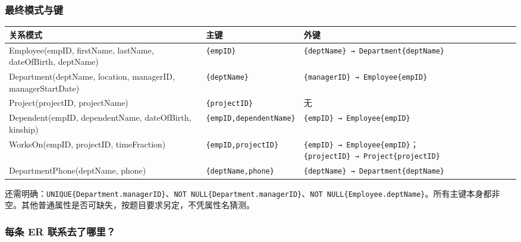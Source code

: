 \subsubsection{最终模式与键}\label{04_er_to_relational_mapping_zh-ux6700ux7ec8ux6a21ux5f0fux4e0eux952e}

\begin{longtable}[]{@{}
  >{\raggedright\arraybackslash}p{}
  >{\raggedright\arraybackslash}p{}
  >{\raggedright\arraybackslash}p{}@{}}
\toprule\noalign{}
\begin{minipage}[b]{\linewidth}\raggedright
关系模式
\end{minipage} & \begin{minipage}[b]{\linewidth}\raggedright
主键
\end{minipage} & \begin{minipage}[b]{\linewidth}\raggedright
外键
\end{minipage} \\
\midrule\noalign{}
\endhead
\bottomrule\noalign{}
\endlastfoot
Employee(empID, firstName, lastName, dateOfBirth, deptName) & \texttt{\{empID\}} & \texttt{\{deptName\}\ →\ Department\{deptName\}} \\
Department(deptName, location, managerID, managerStartDate) & \texttt{\{deptName\}} & \texttt{\{managerID\}\ →\ Employee\{empID\}} \\
Project(projectID, projectName) & \texttt{\{projectID\}} & 无 \\
Dependent(empID, dependentName, dateOfBirth, kinship) & \texttt{\{empID,dependentName\}} & \texttt{\{empID\}\ →\ Employee\{empID\}} \\
WorksOn(empID, projectID, timeFraction) & \texttt{\{empID,projectID\}} & \texttt{\{empID\}\ →\ Employee\{empID\}}；\texttt{\{projectID\}\ →\ Project\{projectID\}} \\
DepartmentPhone(deptName, phone) & \texttt{\{deptName,phone\}} & \texttt{\{deptName\}\ →\ Department\{deptName\}} \\
\end{longtable}

还需明确：\texttt{UNIQUE\{Department.managerID\}}、\texttt{NOT\ NULL\{Department.managerID\}}、\texttt{NOT\ NULL\{Employee.deptName\}}。所有主键本身都非空。其他普通属性是否可缺失，按题目要求另定，不凭属性名猜测。

\subsubsection{每条 ER 联系去了哪里？}\label{04_er_to_relational_mapping_zh-ux6bcfux6761-er-ux8054ux7cfbux53bbux4e86ux54eaux91cc}

